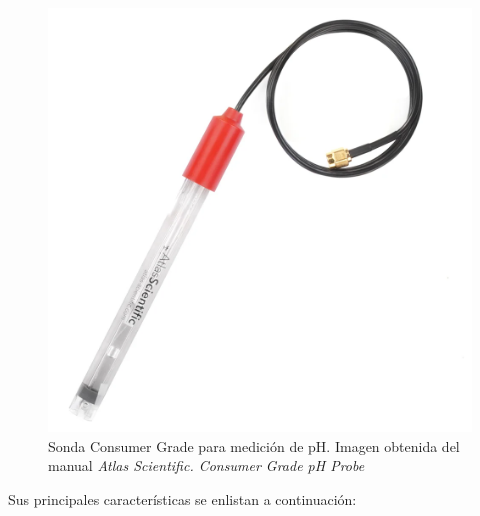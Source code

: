 \begin{figure}[h]
	\centering
	\includegraphics[scale=0.2]{imgss111.png}
	\caption{Sonda Consumer Grade para medición de pH. Imagen obtenida del manual \textit{Atlas Scientific. Consumer Grade pH Probe}}
	\label{fig:figura500_2}
\end{figure}

Sus principales características se enlistan a continuación:

